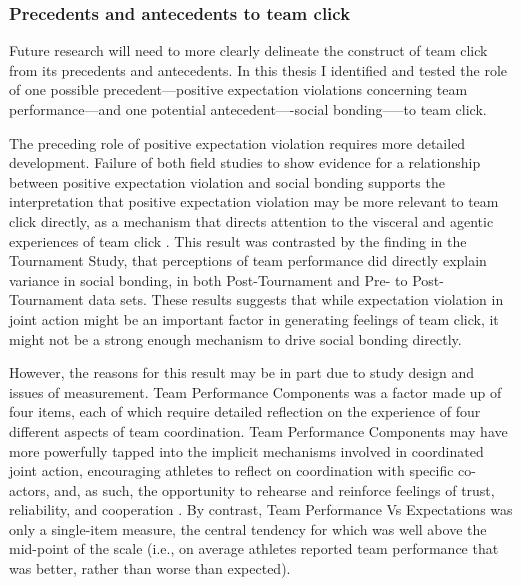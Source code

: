 \subsubsection{Precedents and antecedents to team click}
Future research will need to more clearly delineate the construct of team click from its precedents and antecedents.  In this thesis I identified and tested the role of one possible precedent—positive expectation violations concerning team performance—and one potential antecedent----social bonding—--to team click.

The preceding role of positive expectation violation requires more detailed development.  Failure of both field studies to show evidence for a relationship between positive expectation violation and social bonding supports the interpretation that positive expectation violation may be more relevant to team click directly, as a mechanism that directs attention to the visceral and agentic experiences of team click \citep{Chetverikov2016}.  This result was contrasted by the finding in the Tournament Study, that perceptions of team performance did directly explain variance in social bonding, in both Post-Tournament and Pre- to Post-Tournament data sets.  These results suggests that while expectation violation in joint action might be an important factor in generating feelings of team click, it might not be a strong enough mechanism to drive social bonding directly.

However, the reasons for this result may be in part due to study design and issues of measurement.  Team Performance Components was a factor made up of four items, each of which require detailed reflection on the experience of four different aspects of team coordination.  Team Performance Components may have more powerfully tapped into the implicit mechanisms involved in coordinated joint action, encouraging athletes to reflect on coordination with specific co-actors, and, as such, the opportunity to rehearse and reinforce feelings of trust, reliability, and cooperation \citep{Reddish2013a}.  By contrast, Team Performance Vs Expectations was only a single-item measure, the central tendency for which was well above the mid-point of the scale (i.e., on average athletes reported team performance that was better, rather than worse than expected).

